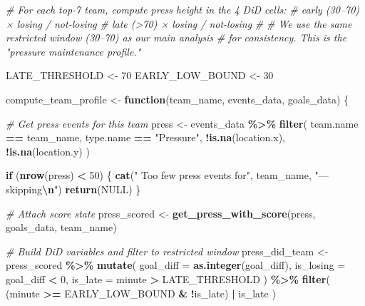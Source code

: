 \documentclass[
]{article}
\newenvironment{Shaded}{\begin{snugshade}}{\end{snugshade}}
\newcommand{\AttributeTok}[1]{\textcolor[rgb]{0.13,0.29,0.53}{#1}}
\newcommand{\CommentTok}[1]{\textcolor[rgb]{0.56,0.35,0.01}{\textit{#1}}}
\newcommand{\ConstantTok}[1]{\textcolor[rgb]{0.56,0.35,0.01}{#1}}
\newcommand{\ControlFlowTok}[1]{\textcolor[rgb]{0.13,0.29,0.53}{\textbf{#1}}}
\newcommand{\DecValTok}[1]{\textcolor[rgb]{0.00,0.00,0.81}{#1}}
\newcommand{\FunctionTok}[1]{\textcolor[rgb]{0.13,0.29,0.53}{\textbf{#1}}}
\newcommand{\NormalTok}[1]{#1}
\newcommand{\OtherTok}[1]{\textcolor[rgb]{0.56,0.35,0.01}{#1}}
\newcommand{\SpecialCharTok}[1]{\textcolor[rgb]{0.81,0.36,0.00}{\textbf{#1}}}
\newcommand{\StringTok}[1]{\textcolor[rgb]{0.31,0.60,0.02}{#1}}
\begin{document}
\begin{Shaded}
\begin{Highlighting}[]
\CommentTok{\# For each top{-}7 team, compute press height in the 4 DiD cells:}
\CommentTok{\#   early (30–70\textquotesingle{}) × losing / not{-}losing}
\CommentTok{\#   late  (\textgreater{}70\textquotesingle{})   × losing / not{-}losing}
\CommentTok{\#}
\CommentTok{\# We use the same restricted window (30–70\textquotesingle{}) as our main analysis}
\CommentTok{\# for consistency. This is the "pressure maintenance profile."}

\NormalTok{LATE\_THRESHOLD  }\OtherTok{\textless{}{-}} \DecValTok{70}
\NormalTok{EARLY\_LOW\_BOUND }\OtherTok{\textless{}{-}} \DecValTok{30}

\NormalTok{compute\_team\_profile }\OtherTok{\textless{}{-}} \ControlFlowTok{function}\NormalTok{(team\_name, events\_data, goals\_data) \{}
  
  \CommentTok{\# Get press events for this team}
\NormalTok{  press }\OtherTok{\textless{}{-}}\NormalTok{ events\_data }\SpecialCharTok{\%\textgreater{}\%}
    \FunctionTok{filter}\NormalTok{(}
\NormalTok{      team.name  }\SpecialCharTok{==}\NormalTok{ team\_name,}
\NormalTok{      type.name  }\SpecialCharTok{==} \StringTok{"Pressure"}\NormalTok{,}
      \SpecialCharTok{!}\FunctionTok{is.na}\NormalTok{(location.x),}
      \SpecialCharTok{!}\FunctionTok{is.na}\NormalTok{(location.y)}
\NormalTok{    )}
  
  \ControlFlowTok{if}\NormalTok{ (}\FunctionTok{nrow}\NormalTok{(press) }\SpecialCharTok{\textless{}} \DecValTok{50}\NormalTok{) \{}
    \FunctionTok{cat}\NormalTok{(}\StringTok{"  Too few press events for"}\NormalTok{, team\_name, }\StringTok{"— skipping}\SpecialCharTok{\textbackslash{}n}\StringTok{"}\NormalTok{)}
    \FunctionTok{return}\NormalTok{(}\ConstantTok{NULL}\NormalTok{)}
\NormalTok{  \}}
  
  \CommentTok{\# Attach score state}
\NormalTok{  press\_scored }\OtherTok{\textless{}{-}} \FunctionTok{get\_press\_with\_score}\NormalTok{(press, goals\_data, team\_name)}
  
  \CommentTok{\# Build DiD variables and filter to restricted window}
\NormalTok{  press\_did\_team }\OtherTok{\textless{}{-}}\NormalTok{ press\_scored }\SpecialCharTok{\%\textgreater{}\%}
    \FunctionTok{mutate}\NormalTok{(}
      \AttributeTok{goal\_diff =} \FunctionTok{as.integer}\NormalTok{(goal\_diff),}
      \AttributeTok{is\_losing =}\NormalTok{ goal\_diff }\SpecialCharTok{\textless{}} \DecValTok{0}\NormalTok{,}
      \AttributeTok{is\_late   =}\NormalTok{ minute }\SpecialCharTok{\textgreater{}}\NormalTok{ LATE\_THRESHOLD}
\NormalTok{    ) }\SpecialCharTok{\%\textgreater{}\%}
    \FunctionTok{filter}\NormalTok{(}
\NormalTok{      (minute }\SpecialCharTok{\textgreater{}=}\NormalTok{ EARLY\_LOW\_BOUND }\SpecialCharTok{\&} \SpecialCharTok{!}\NormalTok{is\_late) }\SpecialCharTok{|}\NormalTok{ is\_late}
\NormalTok{    )}
  

\end{Highlighting}
\end{Shaded}
\end{document}
